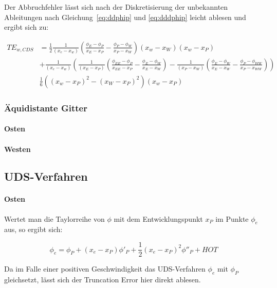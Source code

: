 \documentclass[11pt, ngerman,colorback,accentcolor=tud2d]{tudreport}
\begin{document}
Der Abbruchfehler lässt sich nach der Diskretisierung der unbekannten Ableitungen nach Gleichung~\eqref{eq:ddphip}
und \eqref{eq:dddphip} leicht ablesen und ergibt sich zu:

\begin{align}
  TE_{w, CDS} &=  \frac{1}{2} \frac{1}{(x_e-x_w)} \left({\frac{\phi_E-\phi_P}{x_E-x_P}
  - \frac{\phi_P-\phi_W}{x_P-x_W} }\right) \left({x_w-x_W}\right)(x_w-x_P)  \nonumber\\
  &+ \frac{1}{(x_e-x_w)} \left({
  \frac{1}{(x_E-x_P)} \left({\frac{\phi_{EE}-\phi_P}{x_{EE}-x_P}- \frac{\phi_E-\phi_W}{x_E-x_W} }\right)-
  \frac{1}{(x_P-x_W)} \left({\frac{\phi_E-\phi_W}{x_E-x_W} - \frac{\phi_P-\phi_{WW}}{x_P-x_{WW}} }\right)
  }\right) \nonumber\\
  &\frac{1}{6}  \left({(x_w-x_P)^2-(x_W-x_P)^2}\right)(x_w-x_P)
\end{align}

\subsubsection{Äquidistante Gitter}

\paragraph{Osten}
\paragraph{Westen}


\subsection{UDS-Verfahren}

\paragraph{Osten}

Wertet man die Taylorreihe von $\phi$ mit dem Entwicklungspunkt $x_P$ im Punkte $\phi_e$
aus, so ergibt sich:

\begin{equation*}
  \phi_e = \phi_P +(x_e-x_P) \phi'_P + \frac{1}{2} (x_e-x_P)^2 \phi''_P+HOT
\end{equation*}

Da im Falle einer positiven Geschwindigkeit das UDS-Verfahren $\phi_e$ mit $\phi_P$
gleichsetzt, lässt sich der Truncation Error hier direkt ablesen.
\end{document}
